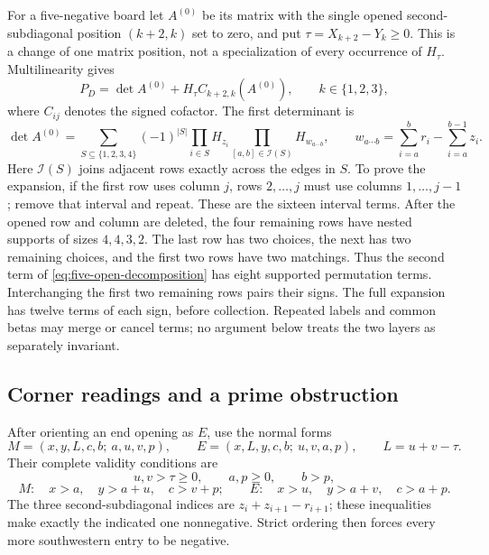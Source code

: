 \documentclass[11pt,a4paper]{amsart}
\numberwithin{equation}{section}
\theoremstyle{plain}
\theoremstyle{definition}
\begin{document}
For a five-negative board let \(A^{(0)}\) be its matrix with the single
opened second-subdiagonal position \((k+2,k)\) set to zero, and put
\(\tau=X_{k+2}-Y_k\ge0\).  This is a change of one matrix position,
not a specialization of every occurrence of \(H_\tau\).  Multilinearity
gives
\begin{equation}\label{eq:five-open-decomposition}
 P_D=\det A^{(0)}+H_\tau C_{k+2,k}(A^{(0)}),\qquad k\in\{1,2,3\},
\end{equation}
where \(C_{ij}\) denotes the signed cofactor.  The first determinant is
\[
 \det A^{(0)}=
 \sum_{S\subseteq\{1,2,3,4\}}(-1)^{|S|}
 \prod_{i\in S}H_{z_i}
 \prod_{[a,b]\in\mathcal I(S)}H_{w_{a\cdots b}},
 \qquad
 w_{a\cdots b}=\sum_{i=a}^b r_i-\sum_{i=a}^{b-1}z_i.
\]
Here \(\mathcal I(S)\) joins adjacent rows exactly across the edges in
\(S\).  To prove the expansion, if the first row uses column \(j\),
rows \(2,\ldots,j\) must use columns \(1,\ldots,j-1\); remove that
interval and repeat.  These are the sixteen interval terms.  After the
opened row and column are deleted, the four remaining rows have nested
supports of sizes \(4,4,3,2\).  The last row has two choices, the next
has two remaining choices, and the first two rows have two matchings.  
Thus the second term of \eqref{eq:five-open-decomposition} has eight
supported permutation terms.  Interchanging the first two remaining
rows pairs their signs.  The full expansion has twelve terms of each
sign, before collection.  Repeated labels and common betas may merge or
cancel terms; no argument below treats the two layers as separately
invariant.  

\subsection{Corner readings and a prime obstruction}

After orienting an end opening as \(E\), use the normal forms
\begin{equation}\label{eq:five-normal-forms}
 M=(x,y,L,c,b;\ a,u,v,p),\qquad
 E=(x,L,y,c,b;\ u,v,a,p),\qquad L=u+v-\tau.
\end{equation}
Their complete validity conditions are
\[
 u,v>\tau\ge0,\qquad a,p\ge0,\qquad b>p,
\]
\[
 M:\quad x>a,\quad y>a+u,\quad c>v+p;
 \qquad
 E:\quad x>u,\quad y>a+v,\quad c>a+p.
\]
The three second-subdiagonal indices are
\(z_i+z_{i+1}-r_{i+1}\); these inequalities make exactly the indicated
one nonnegative.  Strict ordering then forces every more southwestern
entry to be negative.  
\end{document}
